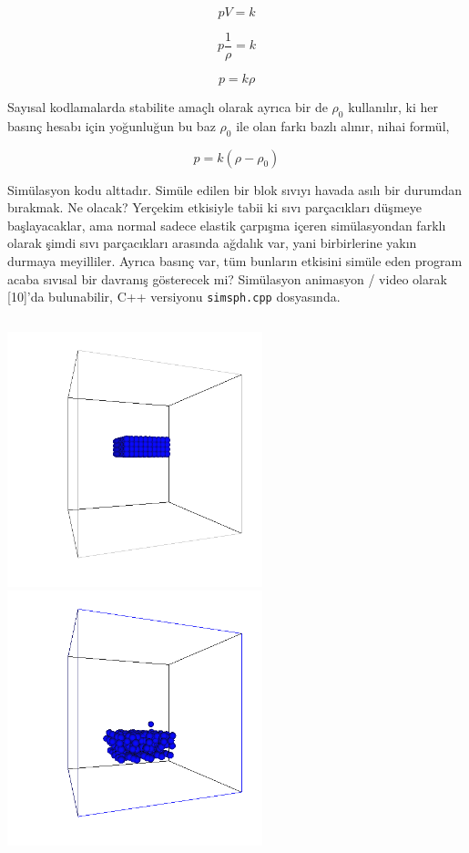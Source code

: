 \documentclass[12pt,fleqn]{article}\usepackage{../../common}
\begin{document}
$$
p V = k
$$

$$
p \frac{1}{\rho} = k
$$

$$
p  = k \rho
$$

Sayısal kodlamalarda stabilite amaçlı olarak ayrıca bir de $\rho_0$ kullanılır,
ki her basınç hesabı için yoğunluğun bu baz $\rho_0$ ile olan farkı bazlı
alınır, nihai formül,

$$
p  = k (\rho - \rho_0)
$$

Simülasyon kodu alttadır. Simüle edilen bir blok sıvıyı havada asılı bir
durumdan bırakmak. Ne olacak? Yerçekim etkisiyle tabii ki sıvı parçacıkları
düşmeye başlayacaklar, ama normal sadece elastik çarpışma içeren simülasyondan
farklı olarak şimdi sıvı parçacıkları arasında ağdalık var, yani birbirlerine
yakın durmaya meyilliler. Ayrıca basınç var, tüm bunların etkisini simüle eden
program acaba sıvısal bir davranış gösterecek mi? Simülasyon animasyon / video
olarak [10]'da bulunabilir, C++ versiyonu \verb!simsph.cpp! dosyasında.

\inputminted[fontsize=\footnotesize]{python}{simsph.py}

\includegraphics[width=20em]{glutout-002.png}
\includegraphics[width=20em]{glutout-004.png}
\end{document}
